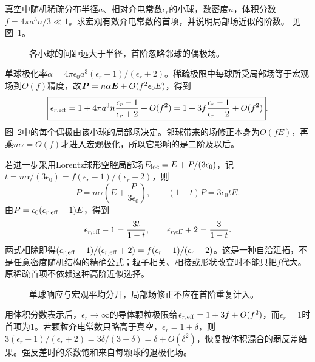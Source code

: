 \begin{example}[稀疏小球构成的有效介质]\label{ex:es4-e4}
真空中随机稀疏分布半径$a$、相对介电常数$\epsilon_r$的小球，数密度$n$，体积分数$f=4\pi a^3n/3\ll1$。求宏观有效介电常数的首项，并说明局部场近似的阶数。 见图~\ref{fig:es4-e4-q}。
\end{example}

\begin{figure}[H]\centering
{}
\caption{各小球的间距远大于半径，首阶忽略邻球的偶极场。}\label{fig:es4-e4-q}
\end{figure}
\begin{solution}
单球极化率$\alpha=4\pi\epsilon_0a^3(\epsilon_r-1)/(\epsilon_r+2)$。稀疏极限中每球所受局部场等于宏观场到$O(f)$精度，故$\bm{P}=n\alpha\bm{E}+O(f^2\epsilon_0E)$，得到
\[\boxed{\epsilon_{r,\rm eff}=1+4\pi a^3n\frac{\epsilon_r-1}{\epsilon_r+2}+O(f^2)
=1+3f\frac{\epsilon_r-1}{\epsilon_r+2}+O(f^2)}.
\]
图~\ref{fig:es4-e4-s}中的每个偶极由该小球的局部场决定。邻球带来的场修正本身为$O(fE)$，再乘$n\alpha=O(f)$才进入宏观极化，所以它影响的是二阶及以后。

若进一步采用Lorentz球形空腔局部场$E_{\rm loc}=E+P/(3\epsilon_0)$，记$t=n\alpha/(3\epsilon_0)=f(\epsilon_r-1)/(\epsilon_r+2)$，则
\[P=n\alpha\left(E+\frac{P}{3\epsilon_0}\right),\qquad
(1-t)P=3\epsilon_0tE.
\]
由$P=\epsilon_0(\epsilon_{r,\rm eff}-1)E$，得到
\[\epsilon_{r,\rm eff}-1=\frac{3t}{1-t},\qquad
\epsilon_{r,\rm eff}+2=\frac3{1-t}.
\]
两式相除即得$(\epsilon_{r,\rm eff}-1)/(\epsilon_{r,\rm eff}+2)=f(\epsilon_r-1)/(\epsilon_r+2)$。这是一种自洽延拓，不是任意密度随机结构的精确公式；粒子相关、相接或形状改变时不能只把$f$代大。原稀疏首项不依赖这种高阶近似选择。
\begin{figure}[H]\centering
{}
\caption{单球响应与宏观平均分开，局部场修正不应在首阶重复计入。}\label{fig:es4-e4-s}
\end{figure}


用体积分数表示后，$\epsilon_r\to\infty$的导体颗粒极限给$\epsilon_{r,\rm eff}=1+3f+O(f^2)$，而$\epsilon_r=1$时首项为1。若颗粒介电常数只略高于真空，$\epsilon_r=1+\delta$，则$3(\epsilon_r-1)/(\epsilon_r+2)=3\delta/(3+\delta)=\delta+O(\delta^2)$，恢复按体积混合的弱反差结果。强反差时的系数饱和来自每颗球的退极化场。
\end{solution}

